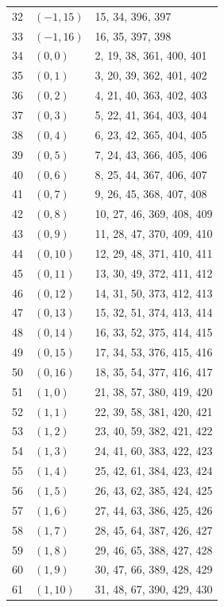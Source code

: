\documentclass{article}
\begin{document}
\begin{longtable}{lll}
  32 & \((-1, 15)\) & 15, 34, 396, 397 \\
  33 & \((-1, 16)\) & 16, 35, 397, 398 \\
  34 & \((0, 0)\) & 2, 19, 38, 361, 400, 401 \\
  35 & \((0, 1)\) & 3, 20, 39, 362, 401, 402 \\
  36 & \((0, 2)\) & 4, 21, 40, 363, 402, 403 \\
  37 & \((0, 3)\) & 5, 22, 41, 364, 403, 404 \\
  38 & \((0, 4)\) & 6, 23, 42, 365, 404, 405 \\
  39 & \((0, 5)\) & 7, 24, 43, 366, 405, 406 \\
  40 & \((0, 6)\) & 8, 25, 44, 367, 406, 407 \\
  41 & \((0, 7)\) & 9, 26, 45, 368, 407, 408 \\
  42 & \((0, 8)\) & 10, 27, 46, 369, 408, 409 \\
  43 & \((0, 9)\) & 11, 28, 47, 370, 409, 410 \\
  44 & \((0, 10)\) & 12, 29, 48, 371, 410, 411 \\
  45 & \((0, 11)\) & 13, 30, 49, 372, 411, 412 \\
  46 & \((0, 12)\) & 14, 31, 50, 373, 412, 413 \\
  47 & \((0, 13)\) & 15, 32, 51, 374, 413, 414 \\
  48 & \((0, 14)\) & 16, 33, 52, 375, 414, 415 \\
  49 & \((0, 15)\) & 17, 34, 53, 376, 415, 416 \\
  50 & \((0, 16)\) & 18, 35, 54, 377, 416, 417 \\
  51 & \((1, 0)\) & 21, 38, 57, 380, 419, 420 \\
  52 & \((1, 1)\) & 22, 39, 58, 381, 420, 421 \\
  53 & \((1, 2)\) & 23, 40, 59, 382, 421, 422 \\
  54 & \((1, 3)\) & 24, 41, 60, 383, 422, 423 \\
  55 & \((1, 4)\) & 25, 42, 61, 384, 423, 424 \\
  56 & \((1, 5)\) & 26, 43, 62, 385, 424, 425 \\
  57 & \((1, 6)\) & 27, 44, 63, 386, 425, 426 \\
  58 & \((1, 7)\) & 28, 45, 64, 387, 426, 427 \\
  59 & \((1, 8)\) & 29, 46, 65, 388, 427, 428 \\
  60 & \((1, 9)\) & 30, 47, 66, 389, 428, 429 \\
  61 & \((1, 10)\) & 31, 48, 67, 390, 429, 430 \\

\end{longtable}
\end{document}

